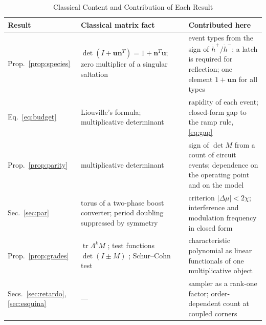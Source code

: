 \documentclass[journal]{IEEEtran}
\begin{document}
\begin{table}[!t]
\caption{Classical Content and Contribution of Each Result}
\label{tab:aporta}
\centering
\footnotesize
\setlength{\tabcolsep}{3pt}
\begin{tabular}{@{}>{\raggedright\arraybackslash}p{}>{\raggedright\arraybackslash}p{}>{\raggedright\arraybackslash}p{}@{}}
\toprule
Result & Classical matrix fact & Contributed here \\
\midrule
Prop.~\ref{prop:species} & $\det(I+\bm{u}\bm{n}^{T})=1+\bm{n}^{T}\bm{u}$; zero
multiplier of a singular saltation \cite{muller1995,kong2024saltation} &
event types from the sign of $\dot h^{+}/\dot h^{-}$; a latch is required for
reflection; one element $1+\bm{u}\bm{n}$ for all types \\
\addlinespace[2pt]
Eq.~\eqref{eq:budget} & Liouville's formula; multiplicative determinant &
rapidity of each event; closed-form gap to the ramp rule, \eqref{eq:gap} \\
\addlinespace[2pt]
Prop.~\ref{prop:parity} & multiplicative determinant & sign of $\det M$ from
a count of circuit events; dependence on the operating point and on the model \\
\addlinespace[2pt]
Sec.~\ref{sec:par} & torus of a two-phase boost converter; period doubling
suppressed by symmetry & criterion $\lvert\Delta\mu\rvert<2\chi$;
interference and modulation frequency in closed form \\
\addlinespace[2pt]
Prop.~\ref{prop:grades} & $\operatorname{tr}\Lambda^{k}M$
\cite{horn2013matrix}; test functions $\det(I\pm M)$ \cite{kuznetsov2004};
Schur--Cohn test & characteristic polynomial as linear functionals of one
multiplicative object \\
\addlinespace[2pt]
Secs.~\ref{sec:retardo}, \ref{sec:esquina} & --- & sampler as a rank-one
factor; order-dependent count at coupled corners \\
\bottomrule
\end{tabular}
\end{table}
\end{document}
